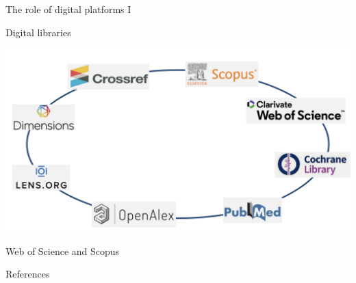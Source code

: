 \documentclass[
  ignorenonframetext,
]{beamer}
\newif\ifbibliography
\begin{document}
\begin{frame}{The role of digital platforms I}
\protect\hypertarget{the-role-of-digital-platforms-i}{}
\begin{block}{Digital libraries}
\protect\hypertarget{digital-libraries}{}
\begin{center}
\includegraphics[width=1\textwidth]{pic_4.png}
\end{center}
\end{block}
\end{frame}

\begin{frame}{Web of Science and Scopus}
\protect\hypertarget{web-of-science-and-scopus}{}
\end{frame}

\renewcommand\refname{References}
\begin{frame}[allowframebreaks]{References}
  \bibliographytrue
  
\end{frame}
\end{document}

